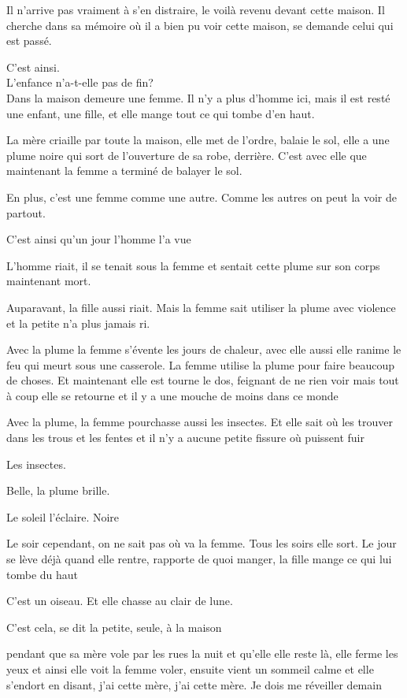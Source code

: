 Il n'arrive pas vraiment à s'en distraire, le voilà revenu devant cette
maison. Il cherche dans sa mémoire où il a bien pu voir cette maison, se
demande celui qui est passé.

C'est ainsi.\\

L'enfance n'a-t-elle pas de fin?\\

Dans la maison demeure une femme. Il n'y a plus d'homme ici, mais il est
resté une enfant, une fille, et elle mange tout ce qui tombe d'en haut.

La mère criaille par toute la maison, elle met de l'ordre, balaie le
sol, elle a une plume noire qui sort de l'ouverture de sa robe,
derrière. C'est avec elle que maintenant la femme a terminé de balayer
le sol.

En plus, c'est une femme comme une autre. Comme les autres on peut la
voir de partout.

C'est ainsi qu'un jour l'homme l'a vue

L'homme riait, il se tenait sous la femme et sentait cette plume sur son
corps maintenant mort.

Auparavant, la fille aussi riait. Mais la femme sait utiliser la plume
avec violence et la petite n'a plus jamais ri.

Avec la plume la femme s'évente les jours de chaleur, avec elle aussi
elle ranime le feu qui meurt sous une casserole. La femme utilise la
plume pour faire beaucoup de choses. Et maintenant elle est tourne le
dos, feignant de ne rien voir mais tout à coup elle se retourne et il y
a une mouche de moins dans ce monde

Avec la plume, la femme pourchasse aussi les insectes. Et elle sait où
les trouver dans les trous et les fentes et il n'y a aucune petite
fissure où puissent fuir

Les insectes.

Belle, la plume brille.

Le soleil l'éclaire. Noire

Le soir cependant, on ne sait pas où va la femme. Tous les soirs elle
sort. Le jour se lève déjà quand elle rentre, rapporte de quoi manger,
la fille mange ce qui lui tombe du haut

C'est un oiseau. Et elle chasse au clair de lune.

C'est cela, se dit la petite, seule, à la maison

pendant que sa mère vole par les rues la nuit et qu'elle elle reste là,
elle ferme les yeux et ainsi elle voit la femme voler, ensuite vient un
sommeil calme et elle s'endort en disant, j'ai cette mère, j'ai cette
mère. Je dois me réveiller demain

